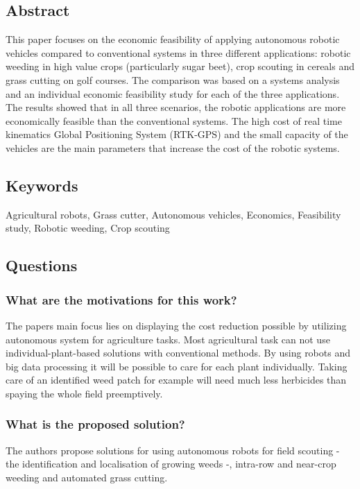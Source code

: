\subsection*{Abstract}
This  paper focuses  on  the  economic  feasibility of  applying  autonomous robotic  vehicles  compared  to  conventional  systems  in  three  different  applications: robotic weeding in high value crops (particularly sugar beet), crop scouting in cereals and grass cutting on golf courses. The comparison was based on a systems analysis and an individual economic feasibility study for each of the three applications. The results  showed  that  in  all  three  scenarios,  the  robotic  applications  are  more  economically feasible than the conventional systems. The high cost of real time kinematics Global Positioning System (RTK-GPS) and the small capacity of the vehicles are the main parameters that increase the cost of the robotic systems.

\subsection*{Keywords}
Agricultural robots, Grass cutter, Autonomous vehicles, Economics, Feasibility study, Robotic weeding, Crop scouting

\subsection*{Questions}

\subsubsection*{What are the motivations for this work?}
The papers main focus lies on displaying the cost reduction possible by utilizing 
autonomous system for agriculture tasks. Most agricultural task can not use individual-plant-based solutions with
conventional methods. By using robots and big data processing it will be possible to care for each plant individually.
Taking care of an identified weed patch for example will need much less herbicides than spaying the whole field preemptively.
\subsubsection*{What is the proposed solution?}
The authors propose solutions for using autonomous robots for field scouting - the identification and localisation 
of growing weeds -, intra-row and near-crop weeding and automated grass cutting. 
